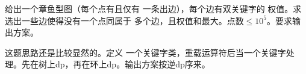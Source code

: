 \begin{prob}
	给出一个章鱼型图（每个点有且仅有
	一条出边），每个边有双关键字的
	权值。求选出一些边使得没有一个点同属于
	多个边，且权值和最大。点数$ \le 10^5$。要求输出方案。
\end{prob}

\begin{sol}
	这题思路还是比较显然的。定义
	一个关键字类，重载运算符后当一个关键字处
	理。先在树上dp，再在环上dp。输出方案按逆dp序来。
\end{sol}
